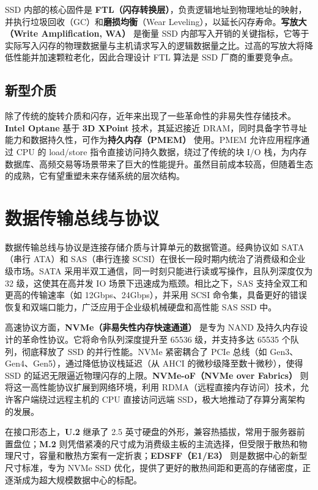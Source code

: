 \documentclass[12pt,UTF8]{ctexbook}
\begin{document}
SSD 内部的核心固件是 \textbf{FTL（闪存转换层）}，负责逻辑地址到物理地址的映射，并执行垃圾回收（GC）和\textbf{磨损均衡}（Wear Leveling），以延长闪存寿命。\textbf{写放大（Write Amplification, WA）} 是衡量 SSD 内部写入开销的关键指标，它等于实际写入闪存的物理数据量与主机请求写入的逻辑数据量之比。过高的写放大将降低性能并加速颗粒老化，因此合理设计 FTL 算法是 SSD 厂商的重要竞争点。

\subsection{新型介质}

除了传统的旋转介质和闪存，近年来出现了一些革命性的非易失性存储技术。\textbf{Intel Optane} 基于 \textbf{3D XPoint} 技术，其延迟接近 DRAM，同时具备字节寻址能力和数据持久性，可作为\textbf{持久内存（PMEM）} 使用。PMEM 允许应用程序通过 CPU 的 load/store 指令直接访问持久数据，绕过了传统的块 I/O 栈，为内存数据库、高频交易等场景带来了巨大的性能提升。虽然目前成本较高，但随着生态的成熟，它有望重塑未来存储系统的层次结构。

\section{数据传输总线与协议}

数据传输总线与协议是连接存储介质与计算单元的数据管道。经典协议如 SATA（串行 ATA）和 SAS（串行连接 SCSI）在很长一段时期内统治了消费级和企业级市场。SATA 采用半双工通信，同一时刻只能进行读或写操作，且队列深度仅为 32 级，这使其在高并发 IO 场景下迅速成为瓶颈。相比之下，SAS 支持全双工和更高的传输速率（如 12Gbps、24Gbps），并采用 SCSI 命令集，具备更好的错误恢复和双端口能力，广泛应用于企业级机械硬盘和高性能 SAS SSD 中。
	
高速协议方面，\textbf{NVMe（非易失性内存快速通道）} 是专为 NAND 及持久内存设计的革命性协议。它将命令队列深度提升至 65536 级，并支持多达 65535 个队列，彻底释放了 SSD 的并行性能。NVMe 紧密耦合了 PCIe 总线（如 Gen3、Gen4、Gen5），通过降低协议栈延迟（从 AHCI 的微秒级降至数十微秒），使得 SSD 的延迟无限逼近物理闪存的上限。\textbf{NVMe-oF（NVMe over Fabrics）} 则将这一高性能协议扩展到网络环境，利用 RDMA（远程直接内存访问）技术，允许客户端绕过远程主机的 CPU 直接访问远端 SSD，极大地推动了存算分离架构的发展。
	
在接口形态上，\textbf{U.2} 继承了 2.5 英寸硬盘的外形，兼容热插拔，常用于服务器前置盘位；\textbf{M.2} 则凭借紧凑的尺寸成为消费级主板的主流选择，但受限于散热和物理尺寸，容量和散热方案有一定折衷；\textbf{EDSFF（E1/E3）} 则是数据中心的新型尺寸标准，专为 NVMe SSD 优化，提供了更好的散热间距和更高的存储密度，正逐渐成为超大规模数据中心的标配。
	
\end{document}
